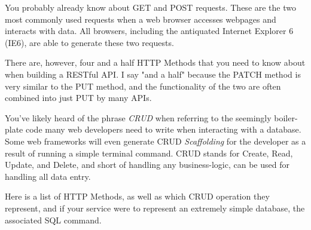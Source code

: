 \documentclass{book}
\begin{document}
You probably already know about GET and POST requests. These are the two most commonly used requests when a web browser accesses webpages and interacts with data. All browsers, including the antiquated Internet Explorer 6 (IE6), are able to generate these two requests.

There are, however, four and a half HTTP Methods that you need to know about when building a RESTful API. I say "and a half" because the PATCH method is very similar to the PUT method, and the functionality of the two are often combined into just PUT by many APIs.

You've likely heard of the phrase \emph{CRUD} when referring to the seemingly boiler-plate code many web developers need to write when interacting with a database. Some web frameworks will even generate CRUD \emph{Scaffolding} for the developer as a result of running a simple terminal command. CRUD stands for Create, Read, Update, and Delete, and short of handling any business-logic, can be used for handling all data entry.

Here is a list of HTTP Methods, as well as which CRUD operation they represent, and if your service were to represent an extremely simple database, the associated SQL command.
\end{document}
